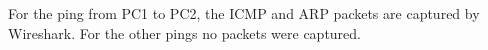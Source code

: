 For the ping from PC1 to PC2, the ICMP and ARP packets are captured by Wireshark.
For the other pings no packets were captured.